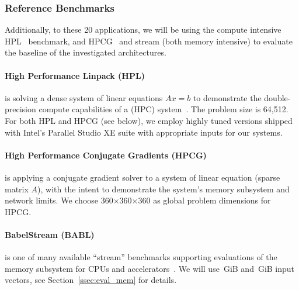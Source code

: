 \subsubsection{Reference Benchmarks}\label{ssec:refbm}

Additionally, to these 20 applications, we will be using the compute intensive HPL~\cite{dongarra_linpack_1988} benchmark,
and HPCG~\cite{dongarra_new_2016} and stream (both memory intensive) to evaluate
the baseline of the investigated architectures. 

\paragraph{High Performance Linpack (HPL)} is solving a dense system of linear equations $Ax = b$
to demonstrate the double-precision compute capabilities of a (HPC)
system~\cite{strohmaier_top500_2018}. The problem size is 64,512.
For both HPL and HPCG (see below), we employ highly tuned versions shipped with Intel's Parallel Studio
XE suite with appropriate inputs for our systems.

\paragraph{High Performance Conjugate Gradients (HPCG)} is applying a conjugate gradient solver
to a system of linear equation (sparse matrix $A$), with the intent to
demonstrate the system's memory subsystem and network limits. We choose 360$\times$360$\times$360 as
global problem dimensions for HPCG.

\paragraph{BabelStream (BABL)} is one of many available ``stream'' benchmarks supporting
evaluations of the memory subsystem for CPUs and accelerators~\cite{deakin_gpu-stream_2016}.
We will use~\unit[2]{GiB} and~\unit[14]{GiB} input vectors, see Section~\ref{ssec:eval_mem}
for details.

